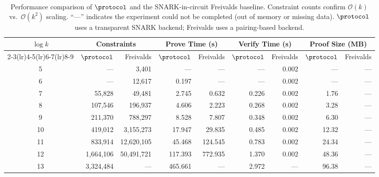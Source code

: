 \begin{table}[t]
\centering
\small
\caption{Performance comparison of $\protocol$ and the SNARK-in-circuit Freivalds baseline.
Constraint counts confirm $\mathcal{O}(k)$ vs.\ $\mathcal{O}(k^2)$ scaling.
``---'' indicates the experiment could not be completed (out of memory or missing data).
$\protocol$ uses a transparent SNARK backend; Freivalds uses a pairing-based backend.}
\label{tab:meow-vs-freivalds}
\begin{tabular}{c rr rr rr rr}
\toprule
\multirow{2}{*}{$\log k$}
  & \multicolumn{2}{c}{\textbf{Constraints}}
  & \multicolumn{2}{c}{\textbf{Prove Time (s)}}
  & \multicolumn{2}{c}{\textbf{Verify Time (s)}}
  & \multicolumn{2}{c}{\textbf{Proof Size (MB)}} \\
\cmidrule(lr){2-3}\cmidrule(lr){4-5}\cmidrule(lr){6-7}\cmidrule(lr){8-9}
  & $\protocol$ & Freivalds
  & $\protocol$ & Freivalds
  & $\protocol$ & Freivalds
  & $\protocol$ & Freivalds \\
\midrule
5  & ---         & 3,401       & ---    & ---    & ---   & 0.002 & ---   & --- \\
6  & ---         & 12,617      & 0.197  & ---    & ---   & 0.002 & ---   & --- \\
7  & 55,828      & 49,481      & 2.745  & 0.632  & 0.226 & 0.002 & 1.76  & --- \\
8  & 107,546     & 196,937     & 4.606  & 2.223  & 0.268 & 0.002 & 3.28  & --- \\
9  & 211,370     & 788,297     & 8.528  & 7.807  & 0.348 & 0.002 & 6.30  & --- \\
10 & 419,012     & 3,155,273   & 17.947 & 29.835 & 0.485 & 0.002 & 12.32 & --- \\
11 & 833,914     & 12,620,105  & 45.468 & 124.545& 0.783 & 0.002 & 24.34 & --- \\
12 & 1,664,106   & 50,491,721  & 117.393& 772.935& 1.370 & 0.002 & 48.36 & --- \\
13 & 3,324,484   & ---         & 465.661& ---    & 2.972 & ---   & 96.38 & --- \\
\bottomrule
\end{tabular}
\end{table}
